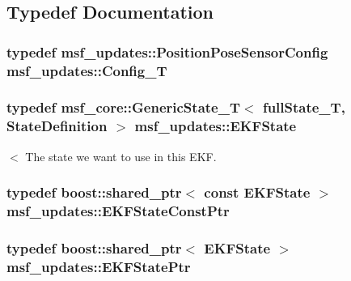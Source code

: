 \subsection{Typedef Documentation}
\hypertarget{namespacemsf__updates_a4f0eca6cc27f15ff678a81cb92219824}{
\subsubsection[{Config\-\_\-\-T}]{\setlength{\rightskip}{0pt plus 5cm}typedef msf\-\_\-updates\-::\-Position\-Pose\-Sensor\-Config {\bf msf\-\_\-updates\-::\-Config\-\_\-\-T}}}\label{namespacemsf__updates_a4f0eca6cc27f15ff678a81cb92219824}
\hypertarget{namespacemsf__updates_a03b0801c76b7400623b00ad4d28f9bcc}{
\subsubsection[{E\-K\-F\-State}]{\setlength{\rightskip}{0pt plus 5cm}typedef {\bf msf\-\_\-core\-::\-Generic\-State\-\_\-\-T}$<$ full\-State\-\_\-\-T, {\bf State\-Definition} $>$ {\bf msf\-\_\-updates\-::\-E\-K\-F\-State}}}\label{namespacemsf__updates_a03b0801c76b7400623b00ad4d28f9bcc}
$<$ The state we want to use in this E\-K\-F. \hypertarget{namespacemsf__updates_ade643a1ed63184fece1ca05ec8142b9d}{
\subsubsection[{E\-K\-F\-State\-Const\-Ptr}]{\setlength{\rightskip}{0pt plus 5cm}typedef boost\-::shared\-\_\-ptr$<$ const {\bf E\-K\-F\-State} $>$ {\bf msf\-\_\-updates\-::\-E\-K\-F\-State\-Const\-Ptr}}}\label{namespacemsf__updates_ade643a1ed63184fece1ca05ec8142b9d}
\hypertarget{namespacemsf__updates_a8b9141b87154a173f69bfabf7300faa9}{
\subsubsection[{E\-K\-F\-State\-Ptr}]{\setlength{\rightskip}{0pt plus 5cm}typedef boost\-::shared\-\_\-ptr$<$ {\bf E\-K\-F\-State} $>$ {\bf msf\-\_\-updates\-::\-E\-K\-F\-State\-Ptr}}}\label{namespacemsf__updates_a8b9141b87154a173f69bfabf7300faa9}

